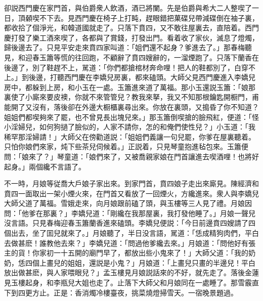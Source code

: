 卻説西門慶在家門首，與伯爵衆人飲酒，酒已將闌。先是伯爵與希大二人整喫了一日，頂顙喫不下去。見西門慶在椅子上打盹，趕眼錯把菓碟兒帶減碟倒在袖子裏，都收拾了個淨光，和韓道國就走了。只落下賁四，又不敢往屋裏去，直陪着。西門慶打發了樂工酒來喫了，各都與了賞錢，打發出門。看着收了家伙，滅息了燈燭，歸後邊去了。只見平安走來賁四家叫道：「姐們還不起身？爹進去了。」那春梅聽見，和迎春玉簫等慌的往回跑，不顧辭了賁四嫂辭的，一溜煙跑了。只落下蘭香在後邊了，別了鞋趕不上，駡道：「你們都搶棺材奔命哩！把人的鞋都別了，白穿不上。」到後邊，打聽西門慶在李嬌兒房裏，都來磕頭。大師父見西門慶進入李嬌兒房中，都躲到上房，和小玉在一處。玉簫進來道了萬福。那小玉還説玉簫：「娘那裏使了小廝來要皮襖，你就不來管管兒？教我來拏，我又不知那根鑰匙開橱門，甫能開了又沒有，落後卻在外邊大橱櫃裏尋出來。你放在裏頭，又搗昏了你不知道？姐姐們都喫夠來了罷，也不曾見長出塊兒來。」那玉簫倒喫搶的臉飛紅，便道：「怪小淫婦兒，如何狗撾了臉似的，人家不請你，怎的和俺們使性兒？」小玉道：「我稀罕那淫婦請！」大師父在傍勸道説：「姐姐們義讓一句兒罷，你爹在屋裏聽着。只怕你娘們來家，炖下些茶兒伺候着。」正説着，只見琴童抱進毡包來。玉簫便問：「娘來了？」琴童道：「娘們來了，又被喬親家娘在門首讓進去喫酒哩！也將好起身。」兩個纔不言語了。

不一時，月娘等従喬大戶娘子家出來。到家門首，賁四娘子走出來廝見。陳經濟和賁四一面取出一架小煙火來，在門首又看放了一回煙火，方纔進來。衆人與李嬌兒大師父道了萬福。雪娥走來，向月娘跟前磕了頭，與玉樓等三人見了禮。月娘因問：「他爹在那裏？」李嬌兒道：「剛纔在我那屋裏，我打發他睡了。」月娘一聲兒沒言語。只見春梅迎春玉簫蘭香進來磕頭。李嬌兒便説：「今日前邊賁四嫂請了四個出去，坐了囬兒就來了。」月娘聽了，半日没言語，駡道：「恁成精狗肉們，平白去做甚麽！誰教他去來？」李嬌兒道：「問過他爹纔去來。」月娘道：「問他好有張主的貨！你家初一十五開的廟門早了，都放出些小鬼來了！」大師父道：「我的奶奶，恁四個上畫兒的姐姐，還説是小鬼？」月娘道：「上畫兒只畫的半邊兒！平白放出做甚麽，與人家喂眼兒？」孟玉樓見月娘説話來的不好，就先走了。落後金蓮見玉樓起身，和李瓶兒大姐也走了。止落下大師父和月娘同在一處睡了。那雪霰直下到四更方止。正是：香消燭冷樓臺夜，挑菜燒燈掃雪天。一宿晚景題過。

